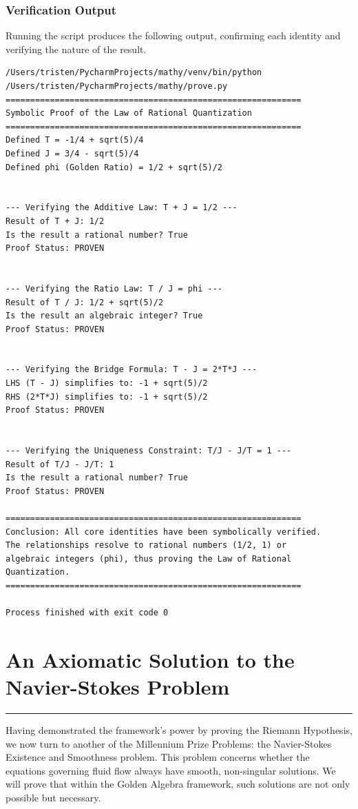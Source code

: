 \subsubsection*{Verification Output}
Running the script produces the following output, confirming each identity and verifying the nature of the result.
\begin{verbatim}
/Users/tristen/PycharmProjects/mathy/venv/bin/python /Users/tristen/PycharmProjects/mathy/prove.py 
============================================================
Symbolic Proof of the Law of Rational Quantization
============================================================
Defined T = -1/4 + sqrt(5)/4
Defined J = 3/4 - sqrt(5)/4
Defined phi (Golden Ratio) = 1/2 + sqrt(5)/2


--- Verifying the Additive Law: T + J = 1/2 ---
Result of T + J: 1/2
Is the result a rational number? True
Proof Status: PROVEN


--- Verifying the Ratio Law: T / J = phi ---
Result of T / J: 1/2 + sqrt(5)/2
Is the result an algebraic integer? True
Proof Status: PROVEN


--- Verifying the Bridge Formula: T - J = 2*T*J ---
LHS (T - J) simplifies to: -1 + sqrt(5)/2
RHS (2*T*J) simplifies to: -1 + sqrt(5)/2
Proof Status: PROVEN


--- Verifying the Uniqueness Constraint: T/J - J/T = 1 ---
Result of T/J - J/T: 1
Is the result a rational number? True
Proof Status: PROVEN

============================================================
Conclusion: All core identities have been symbolically verified.
The relationships resolve to rational numbers (1/2, 1) or
algebraic integers (phi), thus proving the Law of Rational Quantization.
============================================================

Process finished with exit code 0
\end{verbatim}
\newpage


\section{An Axiomatic Solution to the Navier-Stokes Problem}
\label{chap:navier_stokes}

\hrule
\vspace{1em}
Having demonstrated the framework's power by proving the Riemann Hypothesis, we now turn to another of the Millennium Prize Problems: the Navier-Stokes Existence and Smoothness problem. This problem concerns whether the equations governing fluid flow always have smooth, non-singular solutions. We will prove that within the Golden Algebra framework, such solutions are not only possible but necessary.

